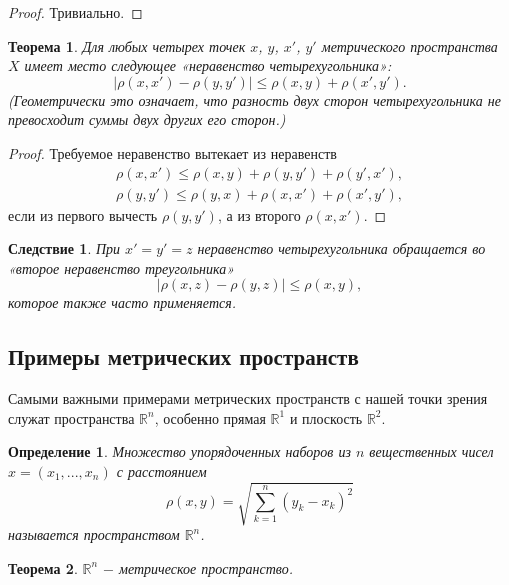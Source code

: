 \documentclass{article}
\newtheorem{theorem}{Теорема}[section]
\newtheorem{definition}{Определение}[section]
\newtheorem*{consequence}{Следствие}
\begin{document}
\begin{proof}
Тривиально.
\end{proof}

\begin{theorem}
Для любых четырех точек \(x\), \(y\), \(x'\), \(y'\) метрического пространства \(X\) имеет место следующее «неравенство четырехугольника»:
\[
|\rho(x, x') - \rho(y, y')| \leq \rho(x, y) + \rho(x', y').
\]
(Геометрически это означает, что разность двух сторон четырехугольника не превосходит суммы двух других его сторон.)
\end{theorem}

\begin{proof}
Требуемое неравенство вытекает из неравенств
\begin{align*}
  \rho(x, x') \leq \rho(x, y) + \rho(y, y') + \rho(y', x'), \\
  \rho(y, y') \leq \rho(y, x) + \rho(x, x') + \rho(x', y'),
\end{align*}
если из первого вычесть \(\rho(y, y')\), а из второго \(\rho(x, x')\).
\end{proof}

\begin{consequence}
При \(x' = y' = z\) неравенство четырехугольника обращается во «второе неравенство треугольника»
\[
|\rho(x, z) - \rho(y, z)| \leq \rho(x, y),
\]
которое также часто применяется.
\end{consequence}

\subsection{Примеры метрических пространств}

Самыми важными примерами метрических пространств с нашей точки зрения служат пространства \(\mathbb{R}^n\), особенно прямая \(\mathbb{R}^1\) и плоскость \(\mathbb{R}^2\).

\begin{definition}
Множество упорядоченных наборов из \(n\) вещественных чисел \(x = (x_1, ..., x_n)\) с расстоянием
\[
\rho(x, y) = \sqrt{\sum_{k = 1}^{n}(y_k - x_k)^2}
\]
называется пространством \(\mathbb{R}^n\).
\end{definition}

\begin{theorem}
\(\mathbb{R}^n\) \(-\) метрическое пространство.
\end{theorem}
\end{document}
